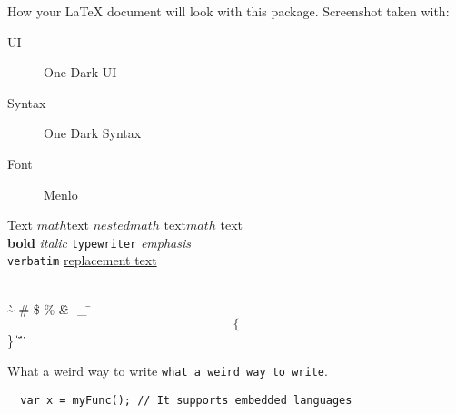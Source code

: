 \documentclass[a4paper]{article}
\begin{document}
How your {\LaTeX} document will look with this package. Screenshot taken with:
\begin{description}
 \item [UI] One Dark UI \item [Syntax] One Dark Syntax \item [Font] Menlo
\end{description}

Text $ math \text{text $nested math$ text} math $ text \\
\textbf{bold} \textit{italic} \texttt{typewriter} \emph{emphasis} \\
\verb|verbatim| \href{http://google.com.au/search?q=author%27s%20URL}{replacement text}

\label{eq:gauss} \autocite{eq:gauss} \\
\` \~ \! \@ \# \$ \% \^ \& \* \( \) \- \_ \= \+ %
\[ \{ \] \} \| \; \: \' \" \, \< \. \> \/ \?    %

What a weir^^64 way to write \verb|what a weird way to write|.
\begin{verbatim}
  var x = myFunc(); // It supports embedded languages
\end{verbatim}
\end{document}
